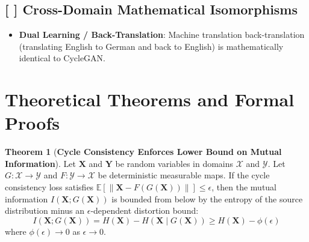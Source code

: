 \documentclass[11pt,a4paper]{article}
\theoremstyle{definition}
\newtheorem{theorem}{\textbf{Theorem}}[section]
\begin{document}
\subsection{[ ] Cross-Domain Mathematical Isomorphisms}
\begin{itemize}
    \item \textbf{Dual Learning / Back-Translation}: Machine translation back-translation (translating English to German and back to English) is mathematically identical to CycleGAN.
\end{itemize}

\section{Theoretical Theorems and Formal Proofs}

\begin{theorem}[\textbf{Cycle Consistency Enforces Lower Bound on Mutual Information}]
Let $\mathbf{X}$ and $\mathbf{Y}$ be random variables in domains $\mathcal{X}$ and $\mathcal{Y}$. Let $G: \mathcal{X} \to \mathcal{Y}$ and $F: \mathcal{Y} \to \mathcal{X}$ be deterministic measurable maps. If the cycle consistency loss satisfies $\mathbb{E}[\|\mathbf{X} - F(G(\mathbf{X}))\|] \le \epsilon$, then the mutual information $I(\mathbf{X}; G(\mathbf{X}))$ is bounded from below by the entropy of the source distribution minus an $\epsilon$-dependent distortion bound:
{\boldmath
\begin{equation}
I(\mathbf{X}; G(\mathbf{X})) = H(\mathbf{X}) - H(\mathbf{X} \mid G(\mathbf{X})) \ge H(\mathbf{X}) - \phi(\epsilon)
\end{equation}
}
where $\phi(\epsilon) \to 0$ as $\epsilon \to 0$.
\end{theorem}
\end{document}

